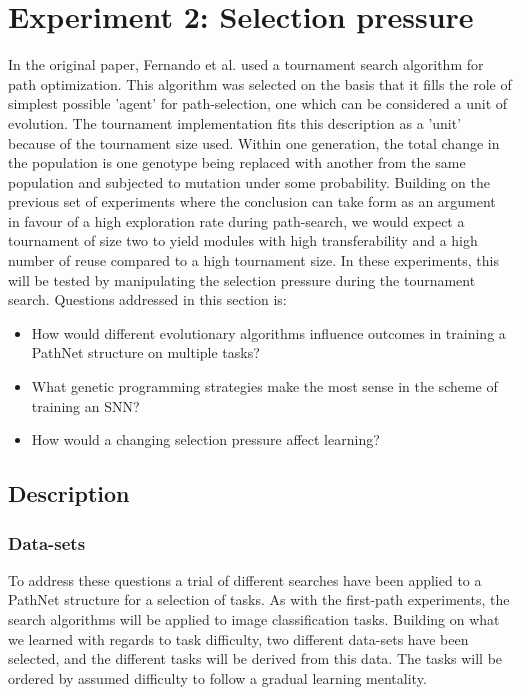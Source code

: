 \chapter{Experiment 2: Selection pressure}
\label{exp2}
In the original paper, Fernando et al. used a tournament search algorithm for path optimization. This algorithm was selected on the basis that it fills the role of simplest possible 'agent' for path-selection, one which can be considered a unit of evolution.  The tournament implementation fits this description as a 'unit' because of the tournament size used. Within one generation, the total change in the population is one genotype being replaced with another from the same population and subjected to mutation under some probability. Building on the previous set of experiments where the conclusion can take form as an argument in favour of a high exploration rate during path-search, we would expect a tournament of size two to yield modules with high transferability and a high number of reuse compared to a high tournament size. In these experiments, this will be tested by manipulating the selection pressure during the tournament search. Questions addressed in this section is: 
\begin{itemize}
    \item How would different evolutionary algorithms influence outcomes in training a PathNet structure on multiple tasks?
    \item What genetic programming strategies make the most sense in the scheme of training an SNN?
    \item How would a changing selection pressure affect learning? 
\end{itemize}
\newpage

\section{Description}
\subsection{Data-sets} \label{exp2:datasets}
To address these questions a trial of different searches have been applied to a PathNet structure for a selection of tasks. As with the first-path experiments, the search algorithms will be applied to image classification tasks. Building on what we learned with regards to task difficulty, two different data-sets have been selected, and the different tasks will be derived from this data. The tasks will be ordered by assumed difficulty to follow a gradual learning mentality. 

